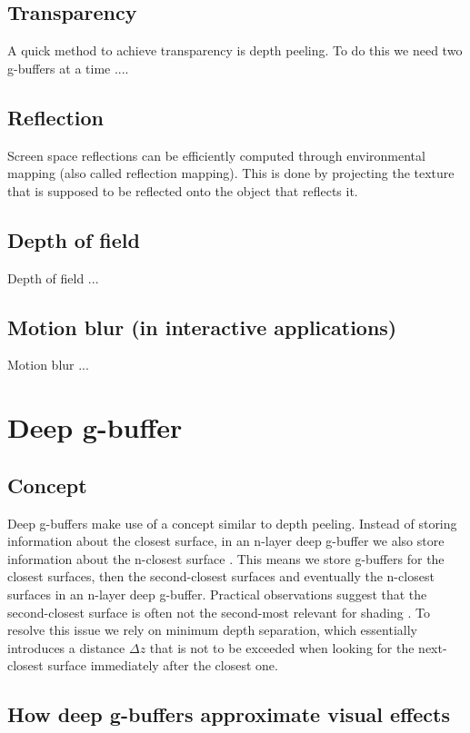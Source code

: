\documentclass{ACGSeminar}
\begin{document}
	\subsection{Transparency}
		A quick method to achieve transparency is depth peeling. To do this we need two g-buffers at a time ...\cite{NOIT}.

	\subsection{Reflection}
		Screen space reflections can be efficiently computed through environmental mapping (also called reflection mapping). This is done by projecting the texture that is supposed to be reflected onto the object that reflects it.

	\subsection{Depth of field}
		Depth of field ...

	\subsection{Motion blur (in interactive applications)}
		Motion blur ...

\section{Deep g-buffer}
	\subsection{Concept}
		Deep g-buffers make use of a concept similar to depth peeling. Instead of storing information about the closest surface, in an n-layer deep g-buffer we also store information about the n-closest surface \cite{NDGB}. This means we store g-buffers for the closest surfaces, then the second-closest surfaces and eventually the n-closest surfaces in an n-layer deep g-buffer. Practical observations suggest that the second-closest surface is often not the second-most relevant for shading \cite{NDGB}. To resolve this issue we rely on minimum depth separation, which essentially introduces a distance $\Delta z$ that is not to be exceeded when looking for the next-closest surface immediately after the closest one.
	\subsection{How deep g-buffers approximate visual effects}
\end{document}
